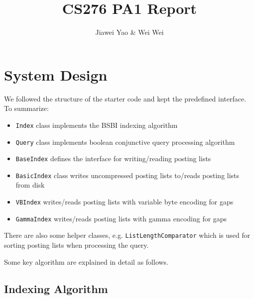 \documentclass{article}
\begin{document}
\title{CS276 PA1 Report}

\author{Jiawei Yao \& Wei Wei}

\maketitle

\section{System Design}

We followed the structure of the starter code and kept the predefined
interface. To summarize:
\begin{itemize}
  \item \texttt{Index} class implements the BSBI indexing algorithm
  
  \item \texttt{Query} class implements boolean conjunctive query
  processing algorithm
  
  \item \texttt{BaseIndex} defines the interface for writing/reading
  posting lists
  
  \item \texttt{BasicIndex} class writes uncompressed posting lists
  to/reads posting lists from disk
  
  \item \texttt{VBIndex} writes/reads posting lists with variable byte
  encoding for gaps
  
  \item \texttt{GammaIndex} writes/reads posting lists with gamma encoding
  for gaps
\end{itemize}
There are also some helper classes, e.g. \texttt{ListLengthComparator}
which is used for sorting posting lists when processing the query.

Some key algorithm are explained in detail as follows.

\subsection{Indexing Algorithm}
\end{document}
